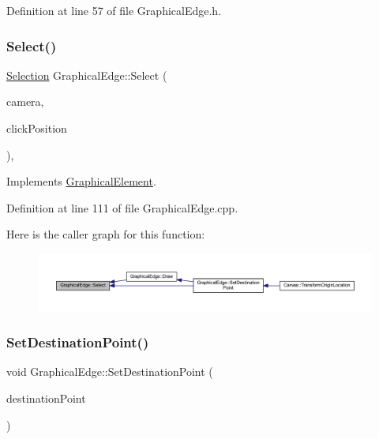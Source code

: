 Definition at line 57 of file Graphical\+Edge.\+h.

\mbox{\label{class_graphical_edge_aa2dbc33d5177ce3aad84f39ba97921de}} 
\subsubsection{\texorpdfstring{Select()}{Select()}}
{\footnotesize\ttfamily \hyperlink{struct_selection}{Selection} Graphical\+Edge\+::\+Select (\begin{DoxyParamCaption}\item[{const wx\+Affine\+Matrix2D \&}]{camera,  }\item[{wx\+Point2\+D\+Double}]{click\+Position }\end{DoxyParamCaption})\hspace{0.3cm}{\ttfamily [override]}, {\ttfamily [virtual]}}



Implements \hyperlink{class_graphical_element_a2627b34e57829f942aa00720d9cc8b46}{Graphical\+Element}.



Definition at line 111 of file Graphical\+Edge.\+cpp.

Here is the caller graph for this function\+:
\nopagebreak
\begin{figure}[H]
\begin{center}
\leavevmode
\includegraphics[width=350pt]{class_graphical_edge_aa2dbc33d5177ce3aad84f39ba97921de_icgraph}
\end{center}
\end{figure}
\mbox{\label{class_graphical_edge_af6eedeeadcd9abc368b1c0725617f5c9}} 
\subsubsection{\texorpdfstring{Set\+Destination\+Point()}{SetDestinationPoint()}}
{\footnotesize\ttfamily void Graphical\+Edge\+::\+Set\+Destination\+Point (\begin{DoxyParamCaption}\item[{wx\+Point2\+D\+Double}]{destination\+Point }\end{DoxyParamCaption})\hspace{0.3cm}{\ttfamily [inline]}}



